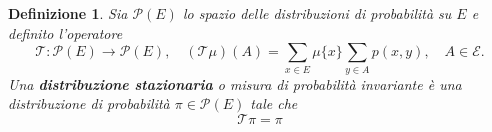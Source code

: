 \documentclass{article}
\newtheorem{definition}{Definizione}[section]
\begin{document}
%
%
%    
%
%
%

\begin{definition}
    \label{def:stazionaria}
    Sia $\mathcal{P}(E)$ lo spazio delle distribuzioni di probabilità su $E$ e definito l'operatore \[
    \mathcal{T}: \mathcal{P}(E) \rightarrow \mathcal{P}(E), \quad(\mathcal{T} \mu)(A)=\sum_{x \in E} \mu\{x\} \sum_{y \in A} p(x, y), \quad A \in \mathcal{E} .
\]
    Una \textbf{distribuzione stazionaria} o misura di probabilità invariante è una distribuzione di probabilità $\pi \in \mathcal{P}(E)$ tale che
    \[
    \mathcal{T} \pi = \pi
    \]

\end{definition}
\end{document}

